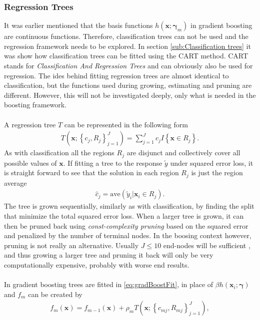 \subsubsection{Regression Trees}
\label{sub:Regression Trees}
It was earlier mentioned that the basis functions $h(\mathbf{x}; \mathbf{\gamma}_m)$ in gradient boosting are continuous functions. Therefore, classification trees can not be used and the regression framework needs to be explored.
In section \ref{sub:Classification trees} it was show how classification trees can be fitted using the CART method. CART stands for \textit{Classification And Regression Trees} and can obviously also be used for regression. The ides behind fitting regression trees are almost identical to classification, but the functions used during growing, estimating and pruning are different. However, this will not be investigated deeply, only what is needed in the boosting framework.\\
\\
A regression tree $T$ can be represented in the following form 
\begin{align}
  T(\mathbf{x}; \left\{ c_j, R_j \right\}_{j = 1}^J)  = \sum^{J}_{j=1} c_j I\left\{ \mathbf{x} \in R_j \right\}.
\end{align}
As with classification all the regions $R_j$ are disjunct and collectively cover all possible values of $\mathbf{x}$. If fitting a tree to the response $\tilde y$ under squared error loss, it is straight forward to see that the solution in each region $R_j$ is just the region average
\begin{align}
  \hat{c}_j = \mathrm{ave}(\tilde y_i | \mathbf{x}_i \in R_j).
\end{align}
The tree is grown sequentially, similarly as with classification, by finding the split that minimize the total squared error loss. When a larger tree is grown, it can then be pruned back using \textit{const-complexity pruning} based on the squared error and penalized by the number of terminal nodes. In the boosing context however, pruning is not really an alternative. Usually $J \leq 10$ end-nodes will be sufficient \cite[p.~363]{modstat}, and thus growing a larger tree and pruning it back will only be very computationally expensive, probably with worse end results. \\
\\
In gradient boosting trees are fitted in \eqref{eq:gradBoostFit}, in place of $\beta h(\mathbf{x}_i; \mathbf{\gamma})$ and $f_m$ can be created by
\begin{align}
  f_m(\mathbf{x}) = f_{m-1}(\mathbf{x}) + \rho_m T(\mathbf{x}; \left\{ c_{m j}, R_{m j} \right\}_{j=1}^{J}),
\end{align}
